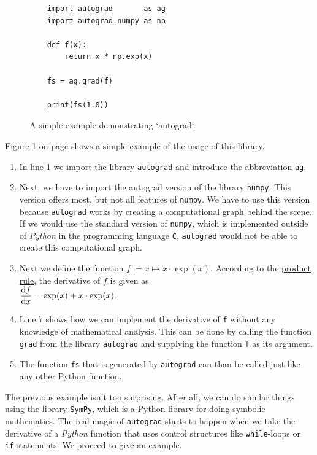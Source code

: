 \begin{figure}[!ht]
\centering
\begin{verbatim}
    import autograd       as ag
    import autograd.numpy as np
    
    def f(x):
        return x * np.exp(x)
    
    fs = ag.grad(f)

    print(fs(1.0))
\end{verbatim}
\vspace*{-0.3cm}
\caption{A simple example demonstrating `autograd`.}
\label{fig:autograd-intro-1.ipynb}
\end{figure}

Figure \ref{fig:autograd-intro-1.ipynb} on page \pageref{fig:autograd-intro-1.ipynb} shows a simple example of
the usage of this library.
\begin{enumerate}
\item In line 1 we import the library \texttt{autograd} and introduce the abbreviation \texttt{ag}.
\item Next, we have to import the autograd version of the library \texttt{numpy}.  This version offers most, but
      not all features of \texttt{numpy}.  We have to use this version because \texttt{autograd} works by creating a
      computational graph behind the scene.  If we would use the standard version of \texttt{numpy}, which is
      implemented outside of \textsl{Python} in the programming language \texttt{C}, \texttt{autograd} would not be able
      to create this computational graph.
\item Next we define the function $f := x \mapsto x \cdot \exp(x)$.  According to the
      \href{https://en.wikipedia.org/wiki/Product_rule}{product rule}, the
      derivative of $f$ is given as 
      \\[0.2cm]
      \hspace*{1.3cm}
      $\displaystyle \frac{\mathrm{d} f}{\mathrm{d} x} = \exp(x) + x \cdot \exp(x)$.
\item Line 7 shows how we can implement the derivative of \texttt{f} without any knowledge of mathematical
      analysis.  This can be done by calling the function \texttt{grad} from the library \texttt{autograd} and
      supplying the function \texttt{f} as its argument.
\item The function \texttt{fs} that is generated by \texttt{autograd} can than be called just like any other
      Python function.
\end{enumerate}
The previous example isn't too surprising.  After all, we can do similar things using the library
\href{https://www.sympy.org/en/index.html}{\texttt{SymPy}}, which is a Python library for doing symbolic
mathematics.  The real magic of \texttt{autograd} starts to happen when we take the derivative of a
\textsl{Python} function that uses control structures like \texttt{while}-loops or \texttt{if}-statements.
We proceed to give an example.


